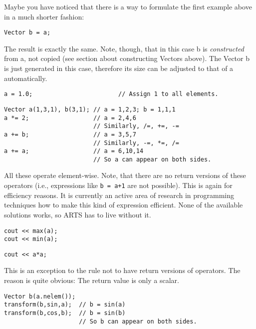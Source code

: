 Maybe you have noticed that there is a way to formulate the first
example above in a much shorter fashion:

\begin{verbatim}
Vector b = a;
\end{verbatim}

The result is exactly the same. Note, though, that in this case b is
\emph{constructed} from a, not copied (see section about constructing
Vectors above). The Vector b is just generated in this case, therefore
its size can be adjusted to that of a automatically.

\begin{verbatim}
a = 1.0;                        // Assign 1 to all elements.
\end{verbatim}

\begin{verbatim}
Vector a(1,3,1), b(3,1); // a = 1,2,3; b = 1,1,1
a *= 2;                  // a = 2,4,6
                         // Similarly, /=, +=, -=
a += b;                  // a = 3,5,7
                         // Similarly, -=, *=, /=
a += a;                  // a = 6,10,14
                         // So a can appear on both sides.
\end{verbatim}

All these operate element-wise.  Note, that there are no return
versions of these operators (i.e., expressions like \verb|b = a+1| are
not possible). This is again for efficiency reasons. It is currently
an active area of research in programming techniques how to make this
kind of expression efficient. None of the available solutions works,
so ARTS has to live without it.

\begin{verbatim}
cout << max(a);
cout << min(a);
\end{verbatim}

\begin{verbatim}
cout << a*a;
\end{verbatim}

This is an exception to the rule not to have return versions of
operators. The reason is quite obvious: The return value is only a
scalar. 

\begin{verbatim}
Vector b(a.nelem());
transform(b,sin,a);  // b = sin(a)
transform(b,cos,b);  // b = sin(b)
                     // So b can appear on both sides.
\end{verbatim}

